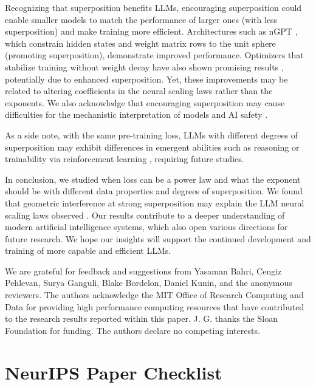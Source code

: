 \documentclass{article}
\begin{document}
Recognizing that superposition benefits LLMs, encouraging superposition could enable smaller models to match the performance of larger ones (with less superposition) and make training more efficient. Architectures such as nGPT \cite{loshchilov2025ngpt}, which constrain hidden states and weight matrix rows to the unit sphere (promoting superposition), demonstrate improved performance. Optimizers that stabilize training without weight decay have also shown promising results \cite{liu2025focus}, potentially due to enhanced superposition. Yet, these improvements may be related to altering coefficients in the neural scaling laws rather than the exponents. We also acknowledge that encouraging superposition may cause difficulties for the mechanistic interpretation of models and AI safety \cite{elhage2022superposition,bereska2024mechanistic}.

As a side note, with the same pre-training loss, LLMs with different degrees of superposition may exhibit differences in emergent abilities such as reasoning or trainability via reinforcement learning \cite{deepseekai2025deepseekr1}, requiring future studies.

In conclusion, we studied when loss can be a power law and what the exponent should be with different data properties and degrees of superposition. We found that geometric interference at strong superposition may explain the LLM neural scaling laws observed \cite{hoffmann2022chinchilla}. Our results contribute to a deeper understanding of modern artificial intelligence systems, which also open various directions for future research. We hope our insights will support the continued development and training of more capable and efficient LLMs.

\begin{ack}
We are grateful for feedback and suggestions from Yasaman Bahri, Cengiz Pehlevan, Surya Ganguli, Blake Bordelon, Daniel Kunin, and the anonymous reviewers. The authors acknowledge the MIT Office of Research Computing and Data for providing high performance computing resources that have contributed to the research results reported within this paper. J. G. thanks the Sloan Foundation for funding. The authors declare no competing interests.
\end{ack}




\section*{NeurIPS Paper Checklist}
\end{document}
